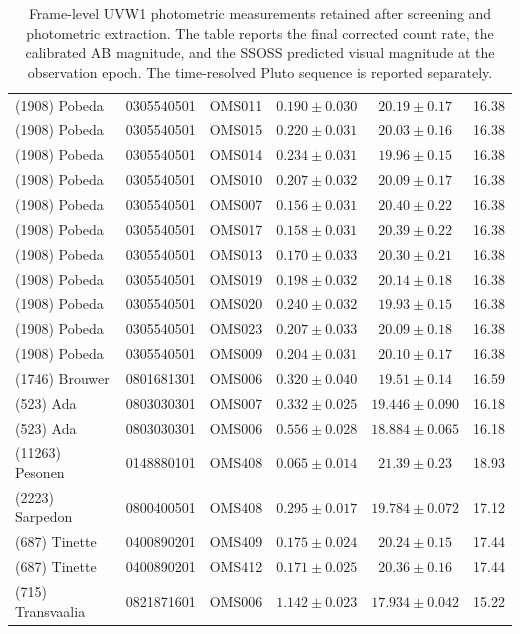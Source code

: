 \begin{table}[t]
\begin{tabular}{lllccc}
(1908) Pobeda & 0305540501 & OMS011 & $0.190 \pm 0.030$ & $20.19 \pm 0.17$ & 16.38 \\
(1908) Pobeda & 0305540501 & OMS015 & $0.220 \pm 0.031$ & $20.03 \pm 0.16$ & 16.38 \\
(1908) Pobeda & 0305540501 & OMS014 & $0.234 \pm 0.031$ & $19.96 \pm 0.15$ & 16.38 \\
(1908) Pobeda & 0305540501 & OMS010 & $0.207 \pm 0.032$ & $20.09 \pm 0.17$ & 16.38 \\
(1908) Pobeda & 0305540501 & OMS007 & $0.156 \pm 0.031$ & $20.40 \pm 0.22$ & 16.38 \\
(1908) Pobeda & 0305540501 & OMS017 & $0.158 \pm 0.031$ & $20.39 \pm 0.22$ & 16.38 \\
(1908) Pobeda & 0305540501 & OMS013 & $0.170 \pm 0.033$ & $20.30 \pm 0.21$ & 16.38 \\
(1908) Pobeda & 0305540501 & OMS019 & $0.198 \pm 0.032$ & $20.14 \pm 0.18$ & 16.38 \\
(1908) Pobeda & 0305540501 & OMS020 & $0.240 \pm 0.032$ & $19.93 \pm 0.15$ & 16.38 \\
(1908) Pobeda & 0305540501 & OMS023 & $0.207 \pm 0.033$ & $20.09 \pm 0.18$ & 16.38 \\
(1908) Pobeda & 0305540501 & OMS009 & $0.204 \pm 0.031$ & $20.10 \pm 0.17$ & 16.38 \\
(1746) Brouwer & 0801681301 & OMS006 & $0.320 \pm 0.040$ & $19.51 \pm 0.14$ & 16.59 \\
(523) Ada & 0803030301 & OMS007 & $0.332 \pm 0.025$ & $19.446 \pm 0.090$ & 16.18 \\
(523) Ada & 0803030301 & OMS006 & $0.556 \pm 0.028$ & $18.884 \pm 0.065$ & 16.18 \\
(11263) Pesonen & 0148880101 & OMS408 & $0.065 \pm 0.014$ & $21.39 \pm 0.23$ & 18.93 \\
(2223) Sarpedon & 0800400501 & OMS408 & $0.295 \pm 0.017$ & $19.784 \pm 0.072$ & 17.12 \\
(687) Tinette & 0400890201 & OMS409 & $0.175 \pm 0.024$ & $20.24 \pm 0.15$ & 17.44 \\
(687) Tinette & 0400890201 & OMS412 & $0.171 \pm 0.025$ & $20.36 \pm 0.16$ & 17.44 \\
(715) Transvaalia & 0821871601 & OMS006 & $1.142 \pm 0.023$ & $17.934 \pm 0.042$ & 15.22 \\
\bottomrule
\end{tabular}
\caption{Frame-level UVW1 photometric measurements retained after screening and photometric extraction. The table reports the final corrected count rate, the calibrated AB magnitude, and the SSOSS predicted visual magnitude at the observation epoch. The time-resolved Pluto sequence is reported separately.}
\label{tab:photometry_output}
\end{table}